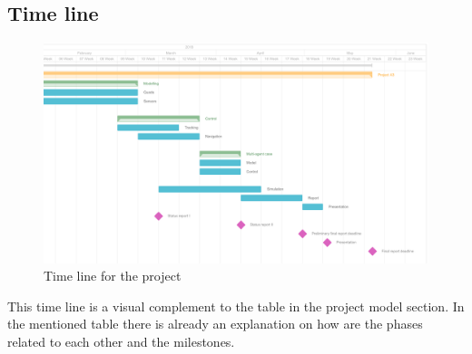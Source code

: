\documentclass{article}
\begin{document}
	\subsection{Time line}
		\begin{figure}[H]
			\centering
			\includegraphics[width=\linewidth]{img/timeline}
			\caption{Time line for the project}
		\end{figure}
		This time line is a visual complement to the table in the project model section. In the mentioned table there is already an explanation on how are the phases related to each other and the milestones.
		
\end{document}
